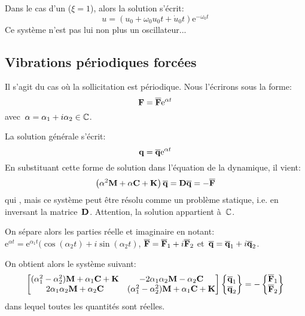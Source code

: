\medskip
Dans le cas d'un  ($\xi=1$), alors la solution s'écrit:
\begin{equation}
u = (u_0+\omega_0u_0t+\dot{u}_0t)\mathrm{e}^{-\omega_0 t}
\end{equation}
Ce système n'est pas lui non plus un oscillateur...




\medskip{}
\subsection{Vibrations périodiques forcées}
Il s'agit du cas où la sollicitation est périodique. Nous l'écrirons sous la forme:
\begin{equation} \VV{F}=\VV{\overline{F}}\mathrm{e}^{\alpha t} \end{equation}
avec~$\alpha=\alpha_1+i\alpha_2\in\mathbb C$.

La solution générale s'écrit:
\begin{equation} \VV{q}=\VV{\overline{q}}\mathrm{e}^{\alpha t} \end{equation}
En substituant cette forme de solution dans l'équation de la dynamique, il vient:
\begin{equation} \left(\alpha^2\MM{M}+\alpha\MM{C}+\MM{K}\right)\VV{\overline{q}}=\MM{D}\VV{\overline{q}}=-\VV{\overline{F}} \end{equation}
qui , mais ce système peut être résolu
comme un problème statique, i.e. en inversant la matrice~$\MM{D}$. Attention, la solution appartient à~$\mathbb C$.

\medskip
On sépare alors les parties réelle et imaginaire en notant:
$\mathrm{e}^{\alpha t}=\mathrm{e}^{\alpha_1 t}(\cos(\alpha_2 t)+i\sin(\alpha_2 t)$, $\VV{\overline{F}}=\VV{\overline{F}}_1
+i\VV{\overline{F}}_2$ et~$\VV{\overline{q}}=\VV{\overline{q}}_1+i\VV{\overline{q}}_2$.

On obtient alors le système suivant:
\begin{equation}
\MM*{(\alpha_1^2-\alpha_2^2)\MM{M}+\alpha_1\MM{C}+\MM{K} & -2\alpha_1\alpha_2\MM{M}-\alpha_2\MM{C}\\
2\alpha_1\alpha_2\MM{M}+\alpha_2\MM{C} & (\alpha_1^2-\alpha_2^2)\MM{M}+\alpha_1\MM{C}+\MM{K}}
\VV*{\VV{\overline{q}}_1\\ \VV{\overline{q}}_2}
=
-\VV*{\VV{\overline{F}}_1\\ \VV{\overline{F}}_2}
\end{equation}
dans lequel toutes les quantités sont réelles.

